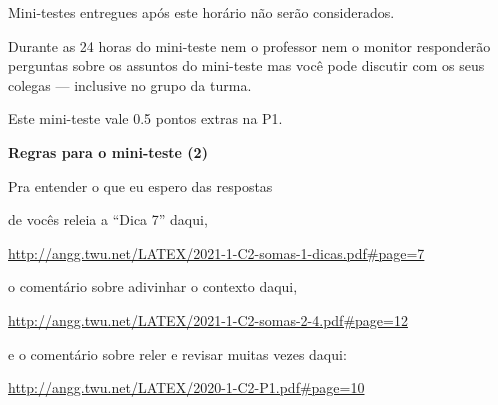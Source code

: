\documentclass[oneside,12pt]{article}
\begin{document}
\ssk


\ssk

Mini-testes entregues após este horário não serão considerados.

Durante as 24 horas do mini-teste nem o professor nem o monitor
responderão perguntas sobre os assuntos do mini-teste mas você pode
discutir com os seus colegas --- inclusive no grupo da turma.

Este mini-teste vale 0.5 pontos extras na P1.

\newpage

{\bf Regras para o mini-teste (2)}

\msk

Pra entender o que eu espero das respostas

de vocês releia a ``Dica 7'' daqui,

{\footnotesize

\url{http://angg.twu.net/LATEX/2021-1-C2-somas-1-dicas.pdf#page=7}
}

\msk

o comentário sobre adivinhar o contexto daqui,

{\footnotesize

\url{http://angg.twu.net/LATEX/2021-1-C2-somas-2-4.pdf#page=12}

}

\msk

e o comentário sobre reler e revisar muitas vezes daqui:

{\footnotesize

\url{http://angg.twu.net/LATEX/2020-1-C2-P1.pdf#page=10}

}


\newpage


%
\pu
\end{document}
